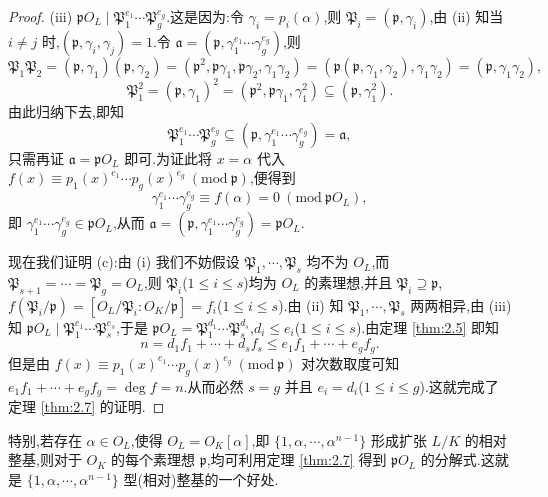 \begin{proof}
(iii) $\mathfrak{p}O_L\mid\mathfrak{P}_1^{e_1}\cdots\mathfrak{P}_g^{e_g}$.这是因为:令 $\gamma_i=p_i(\alpha)$,则 $\mathfrak{P}_i=(\mathfrak{p},\gamma_i)$,由 (ii) 知当 $i\neq j$ 时,$(\mathfrak{p},\gamma_i,\gamma_j)=1$.令 $\mathfrak{a}=(\mathfrak{p},\gamma_1^{e_1}\cdots\gamma_g^{e_g})$,则
\[
  \mathfrak{P}_1\mathfrak{P}_2=(\mathfrak{p},\gamma_1)(\mathfrak{p},\gamma_2)
  =(\mathfrak{p}^2,\mathfrak{p}\gamma_1,\mathfrak{p}\gamma_2,\gamma_1\gamma_2)
  =(\mathfrak{p}(\mathfrak{p},\gamma_1,\gamma_2),\gamma_1\gamma_2)
  =(\mathfrak{p},\gamma_1\gamma_2),
\]
\[
  \mathfrak{P}_1^2=(\mathfrak{p},\gamma_1)^2=(\mathfrak{p}^2,\mathfrak{p}\gamma_1,\gamma_1^2)\subseteq(\mathfrak{p},\gamma_1^2).
\]
由此归纳下去,即知
\[
  \mathfrak{P}_1^{e_1}\cdots\mathfrak{P}_g^{e_g}\subseteq(\mathfrak{p},\gamma_1^{e_1}\cdots\gamma_g^{e_g})=\mathfrak{a},
\]
只需再证 $\mathfrak{a}=\mathfrak{p}O_L$ 即可.为证此将 $x=\alpha$ 代入 $f(x)\equiv p_1(x)^{e_1}\cdots p_g(x)^{e_g}\ (\mathrm{mod}\ \mathfrak{p})$,便得到
\[
  \gamma_1^{e_1}\cdots\gamma_g^{e_g}\equiv f(\alpha)=0\ (\mathrm{mod}\ \mathfrak{p}O_L),
\]
即 $\gamma_1^{e_1}\cdots\gamma_g^{e_g}\in\mathfrak{p}O_L$,从而 $\mathfrak{a}=(\mathfrak{p},\gamma_1^{e_1}\cdots\gamma_g^{e_g})=\mathfrak{p}O_L$.

现在我们证明 (c):由 (i) 我们不妨假设 $\mathfrak{P}_1,\cdots,\mathfrak{P}_s$ 均不为 $O_L$,而 $\mathfrak{P}_{s+1}=\cdots=\mathfrak{P}_g=O_L$,则 $\mathfrak{P}_i$($1\leqslant i\leqslant s$)均为 $O_L$ 的素理想,并且 $\mathfrak{P}_i\supseteq\mathfrak{p}$,$f(\mathfrak{P}_i/\mathfrak{p})=[O_L/\mathfrak{P}_i:O_K/\mathfrak{p}]=f_i$($1\leqslant i\leqslant s$).由 (ii) 知 $\mathfrak{P}_1,\cdots,\mathfrak{P}_s$ 两两相异,由 (iii) 知 $\mathfrak{p}O_L\mid\mathfrak{P}_1^{e_1}\cdots\mathfrak{P}_s^{e_s}$,于是 $\mathfrak{p}O_L=\mathfrak{P}_1^{d_1}\cdots\mathfrak{P}_s^{d_s}$,$d_i\leqslant e_i$($1\leqslant i\leqslant s$).由定理 \ref{thm:2.5} 即知
\[
  n=d_1f_1+\cdots+d_sf_s\leqslant e_1f_1+\cdots+e_gf_g.
\]
但是由 $f(x)\equiv p_1(x)^{e_1}\cdots p_g(x)^{e_g}\ (\mathrm{mod}\ \mathfrak{p})$ 对次数取度可知 $e_1f_1+\cdots+e_gf_g=\deg f=n$.从而必然 $s=g$ 并且 $e_i=d_i$($1\leqslant i\leqslant g$).这就完成了定理 \ref{thm:2.7} 的证明.
\end{proof}

\begin{remark}
特别,若存在 $\alpha\in O_L$,使得 $O_L=O_K[\alpha]$,即 $\{1,\alpha,\cdots,\alpha^{n-1}\}$ 形成扩张 $L/K$ 的相对整基,则对于 $O_K$ 的每个素理想 $\mathfrak{p}$,均可利用定理 \ref{thm:2.7} 得到 $\mathfrak{p}O_L$ 的分解式.这就是 $\{1,\alpha,\cdots,\alpha^{n-1}\}$ 型(相对)整基的一个好处.
\end{remark}

